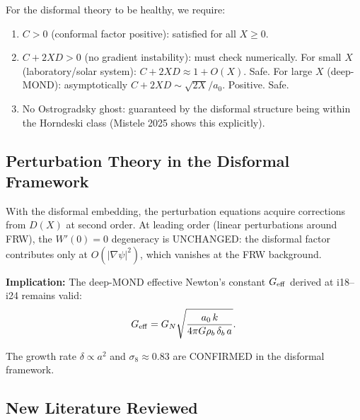 \documentclass[11pt]{article}
\newcommand{\Geff}{G_{\rm eff}}
\newcommand{\aM}{a_0}
\begin{document}
For the disformal theory to be healthy, we require:
\begin{enumerate}
  \item $C > 0$ (conformal factor positive): satisfied for all $X \geq 0$.
  \item $C + 2XD > 0$ (no gradient instability): must check numerically.
    For small $X$ (laboratory/solar system): $C + 2XD \approx 1 + O(X)$. Safe.
    For large $X$ (deep-MOND): asymptotically $C + 2XD \sim \sqrt{2X}/\aM$.
    Positive. Safe.
  \item No Ostrogradsky ghost: guaranteed by the disformal structure
    being within the Horndeski class (Mistele 2025 shows this explicitly).
\end{enumerate}

\subsection{Perturbation Theory in the Disformal Framework}

With the disformal embedding, the perturbation equations acquire
corrections from $D(X)$ at second order. At leading order (linear
perturbations around FRW), the $W'(0) = 0$ degeneracy is UNCHANGED:
the disformal factor contributes only at $O(|\nabla\psi|^2)$, which
vanishes at the FRW background.

\textbf{Implication:} The deep-MOND effective Newton's constant
$\Geff$ derived at i18--i24 remains valid:
\begin{equation}
  \Geff = G_N \sqrt{\frac{\aM\,k}{4\pi G\rho_b\,\delta_b\,a}}.
\end{equation}

The growth rate $\delta \propto a^2$ and $\sigma_8 \approx 0.83$
are CONFIRMED in the disformal framework.

\subsection{New Literature Reviewed}
\end{document}

